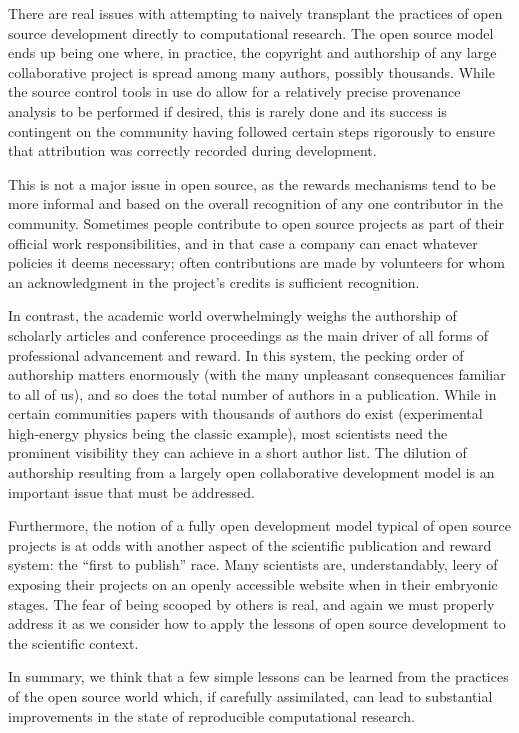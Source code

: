\documentclass[ChapterTOCs,krantz2]{krantz} %
\theoremstyle{definition}
\begin{document}
There are real issues with attempting to
naively transplant the practices of open source development directly
to computational research. The open source model ends up being one
where, in practice, the copyright and authorship of any large collaborative
project is spread among many authors, possibly thousands. While
the source control tools in use do allow for a relatively precise
provenance analysis to be performed if desired, this is rarely done
and its success is contingent on the community having followed certain
steps rigorously to ensure that attribution was correctly recorded
during development.

This is not a major issue in open source, as the rewards mechanisms
tend to be more informal and based on the overall recognition of any
one contributor in the community. Sometimes people contribute to open
source projects as part of their official work responsibilities, and
in that case a company can enact whatever policies it deems necessary;
often contributions are made by volunteers for whom an acknowledgment
in the project's credits is sufficient recognition.

In contrast, the academic world overwhelmingly weighs the authorship
of scholarly articles and conference proceedings as the main driver
of all forms of professional advancement and reward. In this system,
the pecking order of authorship matters enormously (with the many
unpleasant consequences familiar to all of us), and so does the total
number of authors in a publication. While in certain communities papers
with thousands of authors do exist (experimental high-energy physics
being the classic example), most scientists need the prominent visibility
they can achieve in a short author list. The dilution of authorship
resulting from a largely open collaborative development model
is an important issue that must be addressed.

Furthermore, the notion of a fully open development model typical
of open source projects is at odds with another aspect of the
scientific publication and reward system: the ``first
to publish'' race. Many scientists are, understandably,
leery of exposing their projects on an openly accessible website
when in their embryonic stages. The fear of being scooped by others
is real, and again we must properly address it as we consider
how to apply the lessons of open source development to the scientific
context.

In summary, we think that a few simple lessons can be learned from
the practices of the open source world which, if carefully assimilated,
can lead to substantial improvements in the state of reproducible
computational research. 
\end{document}
